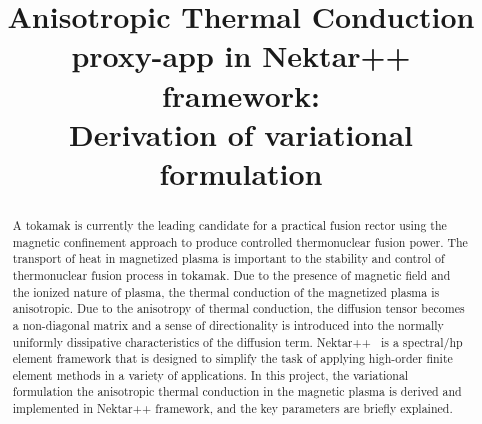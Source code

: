 \documentclass[runningheads]{llncs}
\begin{document}
\mainmatter 

\title{ \Large Anisotropic Thermal Conduction proxy-app in Nektar++ framework:\\
	\vspace{0.5cm}
\large Derivation of variational formulation}

\author{}
\institute{}

\authorrunning{}


\tocauthor{{}}

\maketitle


\begin{abstract}
A tokamak is currently the leading candidate for a practical fusion rector using the magnetic confinement approach to produce controlled thermonuclear fusion power. The transport of heat in magnetized plasma is important to the stability and control of thermonuclear fusion process in tokamak. Due to the presence of magnetic field and the ionized nature of plasma, the thermal conduction of the magnetized plasma is anisotropic. Due to the anisotropy of thermal conduction, the diffusion tensor becomes a non-diagonal matrix and a sense of directionality is introduced into the normally uniformly dissipative characteristics of the diffusion term. Nektar++~\cite{cantwell2015nektar++} is a spectral/hp element framework that is designed to simplify the task of applying high-order finite element methods in a variety of applications. In this project, the variational formulation the anisotropic thermal conduction in the magnetic plasma is derived and implemented in Nektar++ framework, and the key parameters are briefly explained.   
\end{abstract}

\medskip

\begingroup
\let\clearpage\relax
\tableofcontents
\endgroup

\medskip
\medskip
\end{document}
